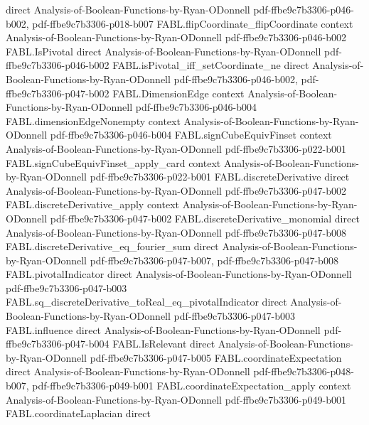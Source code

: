 \begin{theorem}
  {direct}
  {Analysis-of-Boolean-Functions-by-Ryan-ODonnell}
  {pdf-ffbe9c7b3306-p046-b002,
    pdf-ffbe9c7b3306-p018-b007}
\proofstep
  {FABL.flipCoordinate_flipCoordinate}
  {context}
  {Analysis-of-Boolean-Functions-by-Ryan-ODonnell}
  {pdf-ffbe9c7b3306-p046-b002}
\proofstep
  {FABL.IsPivotal}
  {direct}
  {Analysis-of-Boolean-Functions-by-Ryan-ODonnell}
  {pdf-ffbe9c7b3306-p046-b002}
\proofstep
  {FABL.isPivotal_iff_setCoordinate_ne}
  {direct}
  {Analysis-of-Boolean-Functions-by-Ryan-ODonnell}
  {pdf-ffbe9c7b3306-p046-b002,
    pdf-ffbe9c7b3306-p047-b002}
\proofstep
  {FABL.DimensionEdge}
  {context}
  {Analysis-of-Boolean-Functions-by-Ryan-ODonnell}
  {pdf-ffbe9c7b3306-p046-b004}
\proofstep
  {FABL.dimensionEdgeNonempty}
  {context}
  {Analysis-of-Boolean-Functions-by-Ryan-ODonnell}
  {pdf-ffbe9c7b3306-p046-b004}
\proofstep
  {FABL.signCubeEquivFinset}
  {context}
  {Analysis-of-Boolean-Functions-by-Ryan-ODonnell}
  {pdf-ffbe9c7b3306-p022-b001}
\proofstep
  {FABL.signCubeEquivFinset_apply_card}
  {context}
  {Analysis-of-Boolean-Functions-by-Ryan-ODonnell}
  {pdf-ffbe9c7b3306-p022-b001}
\proofstep
  {FABL.discreteDerivative}
  {direct}
  {Analysis-of-Boolean-Functions-by-Ryan-ODonnell}
  {pdf-ffbe9c7b3306-p047-b002}
\proofstep
  {FABL.discreteDerivative_apply}
  {context}
  {Analysis-of-Boolean-Functions-by-Ryan-ODonnell}
  {pdf-ffbe9c7b3306-p047-b002}
\proofstep
  {FABL.discreteDerivative_monomial}
  {direct}
  {Analysis-of-Boolean-Functions-by-Ryan-ODonnell}
  {pdf-ffbe9c7b3306-p047-b008}
\proofstep
  {FABL.discreteDerivative_eq_fourier_sum}
  {direct}
  {Analysis-of-Boolean-Functions-by-Ryan-ODonnell}
  {pdf-ffbe9c7b3306-p047-b007,
    pdf-ffbe9c7b3306-p047-b008}
\proofstep
  {FABL.pivotalIndicator}
  {direct}
  {Analysis-of-Boolean-Functions-by-Ryan-ODonnell}
  {pdf-ffbe9c7b3306-p047-b003}
\proofstep
  {FABL.sq_discreteDerivative_toReal_eq_pivotalIndicator}
  {direct}
  {Analysis-of-Boolean-Functions-by-Ryan-ODonnell}
  {pdf-ffbe9c7b3306-p047-b003}
\proofstep
  {FABL.influence}
  {direct}
  {Analysis-of-Boolean-Functions-by-Ryan-ODonnell}
  {pdf-ffbe9c7b3306-p047-b004}
\proofstep
  {FABL.IsRelevant}
  {direct}
  {Analysis-of-Boolean-Functions-by-Ryan-ODonnell}
  {pdf-ffbe9c7b3306-p047-b005}
\proofstep
  {FABL.coordinateExpectation}
  {direct}
  {Analysis-of-Boolean-Functions-by-Ryan-ODonnell}
  {pdf-ffbe9c7b3306-p048-b007,
    pdf-ffbe9c7b3306-p049-b001}
\proofstep
  {FABL.coordinateExpectation_apply}
  {context}
  {Analysis-of-Boolean-Functions-by-Ryan-ODonnell}
  {pdf-ffbe9c7b3306-p049-b001}
\proofstep
  {FABL.coordinateLaplacian}
  {direct}

\end{theorem}
